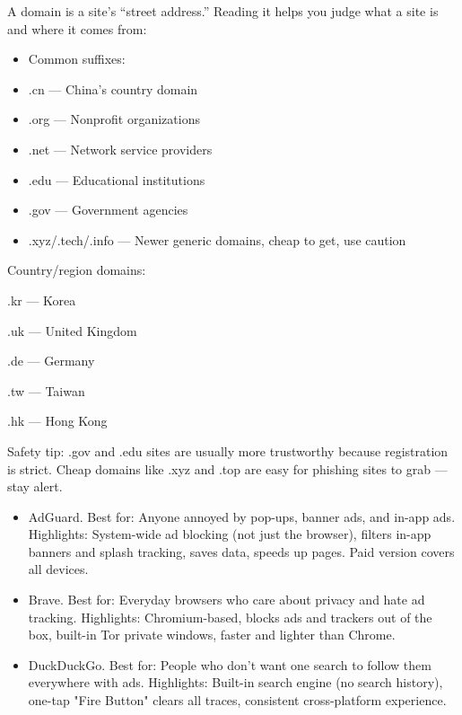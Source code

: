 
A domain is a site's “street address.” Reading it helps you judge what a site is and where it comes from:

\begin{itemize}
  \item Common suffixes:
  \item .cn — China's country domain
  \item .org — Nonprofit organizations
  \item .net — Network service providers
  \item .edu — Educational institutions
  \item .gov — Government agencies
  \item .xyz/.tech/.info — Newer generic domains, cheap to get, use caution
\end{itemize}

Country/region domains:

.kr — Korea

.uk — United Kingdom

.de — Germany

.tw — Taiwan

.hk — Hong Kong

Safety tip: .gov and .edu sites are usually more trustworthy because registration is strict. Cheap domains like .xyz and .top are easy for phishing sites to grab — stay alert.


\begin{itemize}
  \item AdGuard. Best for: Anyone annoyed by pop-ups, banner ads, and in-app ads. Highlights: System-wide ad blocking (not just the browser), filters in-app banners and splash tracking, saves data, speeds up pages. Paid version covers all devices.
\end{itemize}


\begin{itemize}
  \item Brave. Best for: Everyday browsers who care about privacy and hate ad tracking. Highlights: Chromium-based, blocks ads and trackers out of the box, built-in Tor private windows, faster and lighter than Chrome.
  \item DuckDuckGo. Best for: People who don't want one search to follow them everywhere with ads. Highlights: Built-in search engine (no search history), one-tap "Fire Button" clears all traces, consistent cross-platform experience.
\end{itemize}

